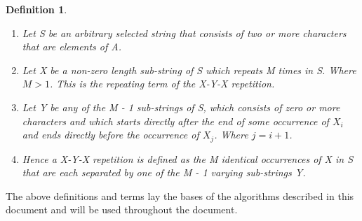 \documentclass[12pt]{article}
\newtheorem{defn}{Definition}[section]
\begin{document}
\begin{flushleft}
\begin{defn}
\begin{enumerate}
			\item Let S be an arbitrary selected string that consists of two or more characters that are elements of A. 
			\item Let X be a non-zero length sub-string of S which repeats M times in S. Where $ M > 1 $. This is the repeating term of the X-Y-X repetition.		
			\item  Let Y be any of the M - 1 sub-strings of S, which consists of zero or more characters and which starts directly after the end of some occurrence of $X_{i}$ and ends directly before the occurrence of $X_{j}$. Where $j = i + 1$.
			\item Hence a X-Y-X repetition is defined as the M identical occurrences of X in S that are each separated by one of the M - 1 varying sub-strings Y.	
		\end{enumerate}
	\end{defn}
	
	The above definitions and terms lay the bases of the algorithms described in this document and will be used throughout the document.
\end{flushleft}
\newpage
\end{document}

